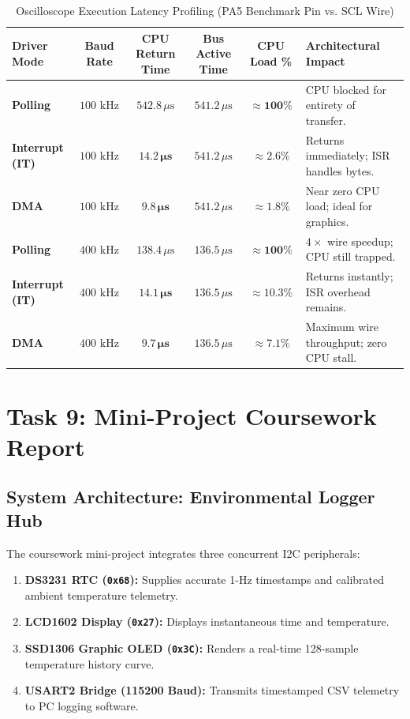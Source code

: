 \documentclass[11pt,a4paper,oneside]{report}
\begin{document}
\begin{table}[h!]
\centering
\small
\caption{Oscilloscope Execution Latency Profiling (PA5 Benchmark Pin vs. SCL Wire)}
\vspace{4pt}
\begin{tabularx}{\textwidth}{l c c c c X}
\toprule
\textbf{Driver Mode} & \textbf{Baud Rate} & \textbf{CPU Return Time} & \textbf{Bus Active Time} & \textbf{CPU Load \%} & \textbf{Architectural Impact} \\
\midrule
\textbf{Polling} & $100\text{ kHz}$ & $542.8\,\mu\text{s}$ & $541.2\,\mu\text{s}$ & $\mathbf{\approx 100\%}$ & CPU blocked for entirety of transfer. \\
\textbf{Interrupt (IT)} & $100\text{ kHz}$ & $\mathbf{14.2\,\mu\text{s}}$ & $541.2\,\mu\text{s}$ & $\mathbf{\approx 2.6\%}$ & Returns immediately; ISR handles bytes. \\
\textbf{DMA} & $100\text{ kHz}$ & $\mathbf{9.8\,\mu\text{s}}$ & $541.2\,\mu\text{s}$ & $\mathbf{\approx 1.8\%}$ & Near zero CPU load; ideal for graphics. \\
\midrule
\textbf{Polling} & $400\text{ kHz}$ & $138.4\,\mu\text{s}$ & $136.5\,\mu\text{s}$ & $\mathbf{\approx 100\%}$ & $4\times$ wire speedup; CPU still trapped. \\
\textbf{Interrupt (IT)} & $400\text{ kHz}$ & $\mathbf{14.1\,\mu\text{s}}$ & $136.5\,\mu\text{s}$ & $\mathbf{\approx 10.3\%}$ & Returns instantly; ISR overhead remains. \\
\textbf{DMA} & $400\text{ kHz}$ & $\mathbf{9.7\,\mu\text{s}}$ & $136.5\,\mu\text{s}$ & $\mathbf{\approx 7.1\%}$ & Maximum wire throughput; zero CPU stall. \\
\bottomrule
\end{tabularx}
\end{table}

\chapter{Task 9: Mini-Project Coursework Report}

\section{System Architecture: Environmental Logger Hub}
The coursework mini-project integrates three concurrent I2C peripherals:
\begin{enumerate}
    \item \textbf{DS3231 RTC (\texttt{0x68}):} Supplies accurate 1-Hz timestamps and calibrated ambient temperature telemetry.
    \item \textbf{LCD1602 Display (\texttt{0x27}):} Displays instantaneous time and temperature.
    \item \textbf{SSD1306 Graphic OLED (\texttt{0x3C}):} Renders a real-time 128-sample temperature history curve.
    \item \textbf{USART2 Bridge (115200 Baud):} Transmits timestamped CSV telemetry to PC logging software.
\end{enumerate}
\end{document}
